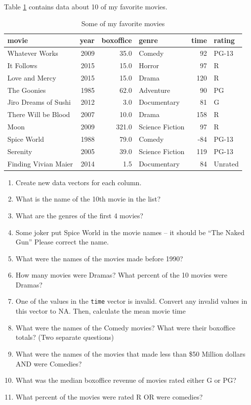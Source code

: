 \documentclass[]{book}
\theoremstyle{definition}
\theoremstyle{definition}
\theoremstyle{remark}
\begin{document}
Table \ref{tab:moviedata} contains data about 10 of my favorite movies.

\begin{table}

\caption{\label{tab:moviedata}Some of my favorite movies}
\centering
\begin{tabular}[t]{l|r|r|l|r|l}
\hline
movie & year & boxoffice & genre & time & rating\\
\hline
Whatever Works & 2009 & 35.0 & Comedy & 92 & PG-13\\
\hline
It Follows & 2015 & 15.0 & Horror & 97 & R\\
\hline
Love and Mercy & 2015 & 15.0 & Drama & 120 & R\\
\hline
The Goonies & 1985 & 62.0 & Adventure & 90 & PG\\
\hline
Jiro Dreams of Sushi & 2012 & 3.0 & Documentary & 81 & G\\
\hline
There Will be Blood & 2007 & 10.0 & Drama & 158 & R\\
\hline
Moon & 2009 & 321.0 & Science Fiction & 97 & R\\
\hline
Spice World & 1988 & 79.0 & Comedy & -84 & PG-13\\
\hline
Serenity & 2005 & 39.0 & Science Fiction & 119 & PG-13\\
\hline
Finding Vivian Maier & 2014 & 1.5 & Documentary & 84 & Unrated\\
\hline
\end{tabular}
\end{table}

\begin{enumerate}
\def\labelenumi{\arabic{enumi}.}
\setcounter{enumi}{-1}
\item
  Create new data vectors for each column.
\item
  What is the name of the 10th movie in the list?
\item
  What are the genres of the first 4 movies?
\item
  Some joker put Spice World in the movie names -- it should be ``The
  Naked Gun'' Please correct the name.
\item
  What were the names of the movies made before 1990?
\item
  How many movies were Dramas? What percent of the 10 movies were
  Dramas?
\item
  One of the values in the \texttt{time} vector is invalid. Convert any
  invalid values in this vector to NA. Then, calculate the mean movie
  time
\item
  What were the names of the Comedy movies? What were their boxoffice
  totals? (Two separate questions)
\item
  What were the names of the movies that made less than \$50 Million
  dollars AND were Comedies?
\item
  What was the median boxoffice revenue of movies rated either G or PG?
\item
  What percent of the movies were rated R OR were comedies?
\end{enumerate}
\end{document}

